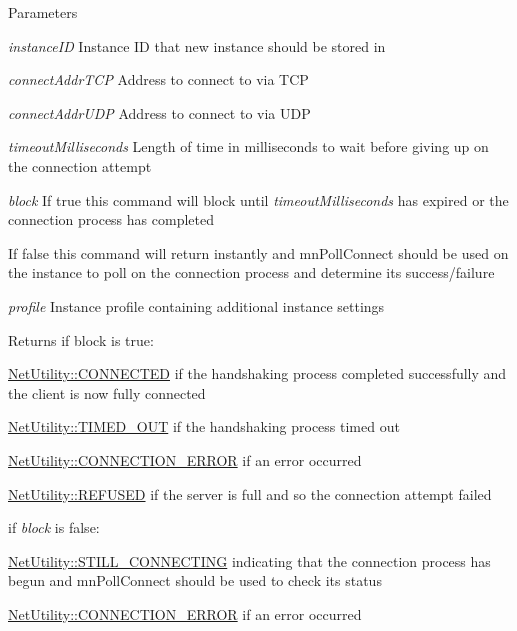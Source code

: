 \begin{DoxyParams}{Parameters}
\item[{\em instanceID}]Instance ID that new instance should be stored in \item[{\em connectAddrTCP}]Address to connect to via TCP \item[{\em connectAddrUDP}]Address to connect to via UDP \item[{\em timeoutMilliseconds}]Length of time in milliseconds to wait before giving up on the connection attempt \item[{\em block}]If true this command will block until {\itshape timeoutMilliseconds\/} has expired or the connection process has completed \par
 If false this command will return instantly and mnPollConnect should be used on the instance to poll on the connection process and determine its success/failure \item[{\em profile}]Instance profile containing additional instance settings\end{DoxyParams}
\begin{DoxyReturn}{Returns}
if block is true: \par
 

\hyperlink{class_net_utility_a7eae52138f8bd597ffc67ebf07e86b6da9c07ac24fb9bdd4157ace978968721fd}{NetUtility::CONNECTED} if the handshaking process completed successfully and the client is now fully connected 

\hyperlink{class_net_utility_a7eae52138f8bd597ffc67ebf07e86b6da319e02f6059b4b08edd70c16fa5206fd}{NetUtility::TIMED\_\-OUT} if the handshaking process timed out 

\hyperlink{class_net_utility_a7eae52138f8bd597ffc67ebf07e86b6da7c6b34544a99c4c264366f2fed4f0973}{NetUtility::CONNECTION\_\-ERROR} if an error occurred 

\hyperlink{class_net_utility_a7eae52138f8bd597ffc67ebf07e86b6dabc894c2de7a4404e353f3bcc1193e90b}{NetUtility::REFUSED} if the server is full and so the connection attempt failed\par
\par


if {\itshape block\/} is false:\par
 

\hyperlink{class_net_utility_a7eae52138f8bd597ffc67ebf07e86b6da86caa623f8ffc60da40df3c2ab17532c}{NetUtility::STILL\_\-CONNECTING} indicating that the connection process has begun and mnPollConnect should be used to check its status 

\hyperlink{class_net_utility_a7eae52138f8bd597ffc67ebf07e86b6da7c6b34544a99c4c264366f2fed4f0973}{NetUtility::CONNECTION\_\-ERROR} if an error occurred 
\end{DoxyReturn}
